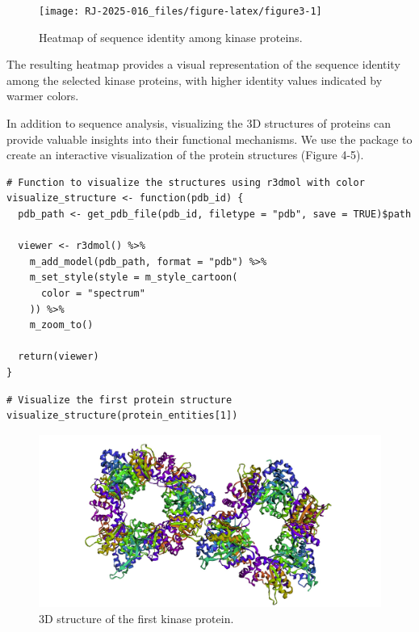\begin{figure}[H]
\texttt{[image: RJ-2025-016\_files/figure-latex/figure3-1]} \caption{Heatmap of sequence identity among kinase proteins.}\label{fig:figure3}
\end{figure}

The resulting heatmap provides a visual representation of the sequence identity among the selected kinase proteins, with higher identity values indicated by warmer colors.

In addition to sequence analysis, visualizing the 3D structures of proteins can provide valuable insights into their functional mechanisms. We use the  package to create an interactive visualization of the protein structures (Figure 4-5).

\begin{verbatim}
# Function to visualize the structures using r3dmol with color
visualize_structure <- function(pdb_id) {
  pdb_path <- get_pdb_file(pdb_id, filetype = "pdb", save = TRUE)$path

  viewer <- r3dmol() %>%
    m_add_model(pdb_path, format = "pdb") %>%
    m_set_style(style = m_style_cartoon(
      color = "spectrum"
    )) %>%
    m_zoom_to()

  return(viewer)
}
\end{verbatim}

\begin{verbatim}
# Visualize the first protein structure
visualize_structure(protein_entities[1])
\end{verbatim}

\begin{figure}[H]

{\centering \includegraphics[width=1\linewidth,]{figures/figure4} 

}

\caption{3D structure of the first kinase protein.}\label{fig:figure4}
\end{figure}

